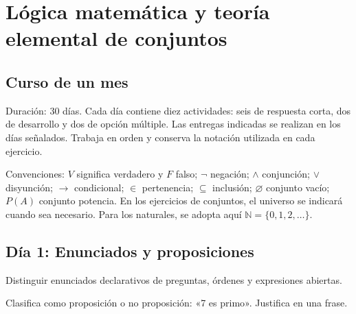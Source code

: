 \chapter{Lógica matemática y teoría elemental de conjuntos}

\section{Curso de un mes}

\begin{lesson}[id=curso-guia-general,weight=0]

Duración: 30 días. Cada día contiene diez actividades: seis de respuesta corta, dos de desarrollo y dos de opción múltiple. Las entregas indicadas se realizan en los días señalados. Trabaja en orden y conserva la notación utilizada en cada ejercicio.

\end{lesson}

\begin{lesson}[id=convenciones-notacion,weight=0]

Convenciones: \(V\) significa verdadero y \(F\) falso; \(\neg\) negación; \(\land\) conjunción; \(\lor\) disyunción; \(\to\) condicional; \(\in\) pertenencia; \(\subseteq\) inclusión; \(\varnothing\) conjunto vacío; \(P(A)\) conjunto potencia. En los ejercicios de conjuntos, el universo se indicará cuando sea necesario. Para los naturales, se adopta aquí \(\mathbb{N}=\{0,1,2,\ldots\}\).

\end{lesson}

\section{Día 1: Enunciados y proposiciones}

\begin{lesson}[id=dia-01-lectura,weight=0]

Distinguir enunciados declarativos de preguntas, órdenes y expresiones abiertas.

\end{lesson}

\begin{activity}[id=dia-01-corta-01,type=choice,weight=1]

Clasifica como proposición o no proposición: «7 es primo». Justifica en una frase.


\end{activity}


